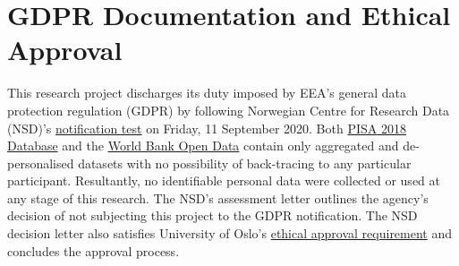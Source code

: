 \chapter{\textsc{GDPR} Documentation and Ethical Approval}


This research project discharges its duty imposed by \textsc{EEA}'s general data protection regulation (\textsc{GDPR}) by following Norwegian Centre for Research Data (\textsc{NSD})'s \href{https://nsd.no/personvernombud/en/notify/notification_test.html}{notification test} on Friday, 11 September 2020. Both \href{https://www.oecd.org/pisa/data/2018database/}{\textsc{PISA} 2018 Database} and the \href{https://data.worldbank.org/}{World Bank Open Data} contain only aggregated and de-personalised datasets with no possibility of back-tracing to any particular participant. Resultantly, no identifiable personal data were collected or used at any stage of this research. The \textsc{NSD}'s assessment letter outlines the agency's decision of not subjecting this project to the \textsc{GDPR} notification. The \textsc{NSD} decision letter also satisfies University of Oslo's \href{https://www.uio.no/english/for-employees/support/research/funding/units/hf/imv/data-ethics/}{ethical approval requirement} and concludes the approval process.





